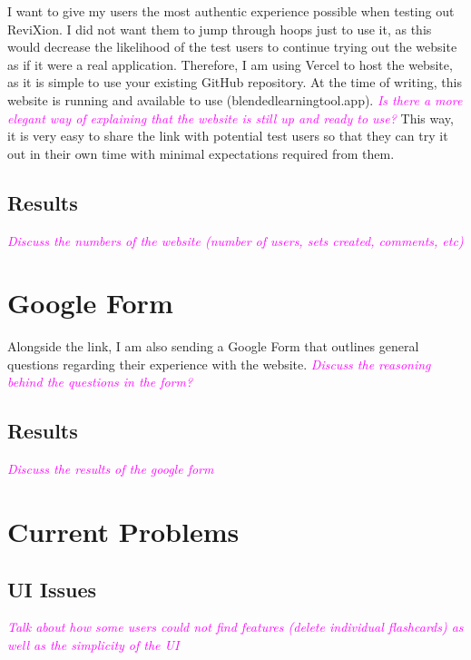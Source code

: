 \documentclass{report}
\begin{document}
I want to give my users the most authentic experience possible when testing out ReviXion.
I did not want them to jump through hoops just to use it,
as this would decrease the likelihood of the test users to continue trying out the website as if it were a real application.
Therefore, I am using Vercel to host the website, as it is simple to use your existing GitHub repository.
At the time of writing, this website is running and available to use (blendedlearningtool.app).
\textcolor{magenta}{\textit{Is there a more elegant way of explaining that the website is still up and ready to use?}}
This way, it is very easy to share the link with potential test users so that they can try it out in their own time with minimal expectations required from them.

\subsection{Results}

\textcolor{magenta}{\textit{Discuss the numbers of the website (number of users, sets created, comments, etc)}}

\section{Google Form}

Alongside the link, I am also sending a Google Form that outlines general questions regarding their experience with the website.
\textcolor{magenta}{\textit{Discuss the reasoning behind the questions in the form?}}

\subsection{Results}

\textcolor{magenta}{\textit{Discuss the results of the google form}}

\section{Current Problems}

\subsection{UI Issues}

\textcolor{magenta}{\textit{Talk about how some users could not find features (delete individual flashcards) as well as the simplicity of the UI}}
\end{document}
